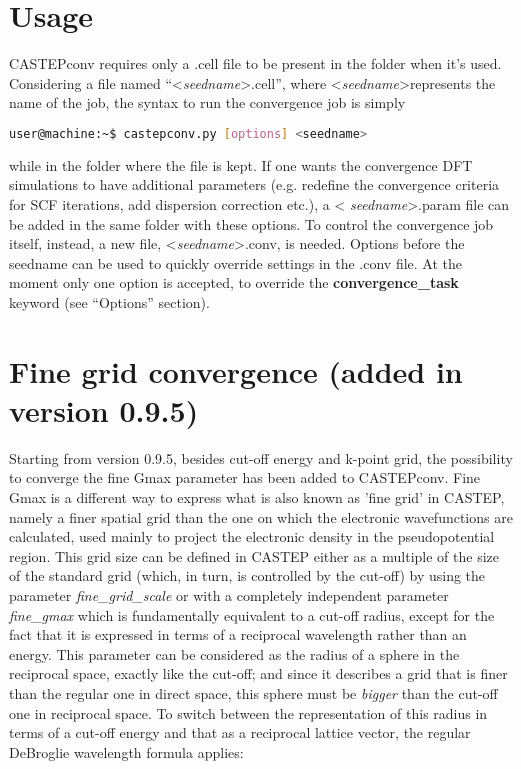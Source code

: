 \documentclass[10pt]{article}
\begin{document}
\section{Usage}

CASTEPconv requires only a .cell file to be present in the folder when it's 
used. Considering a file named ``\textless \textit{seedname}\textgreater.cell'', 
where \textless \textit{seedname}\textgreater represents the name of the job, 
the syntax to run the convergence job is simply

\begin{lstlisting}[language=Bash]
 user@machine:~$ castepconv.py [options] <seedname>
\end{lstlisting}

while in the folder where the file is kept. If one wants the convergence DFT 
simulations to have additional parameters (e.g. redefine the convergence 
criteria for SCF iterations, add dispersion correction etc.), a \textless 
\textit{seedname}\textgreater.param file can be added in the same folder with 
these options. To control the convergence job itself, instead, a new file, 
\textless \textit{seedname}\textgreater.conv, is needed.\newline
Options before the seedname can be used to quickly override settings in the .conv file.
At the moment only one option is accepted, to override the \textbf{convergence\_task} keyword (see ``Options'' section).

\section{Fine grid convergence (added in version 0.9.5)}

Starting from version 0.9.5, besides cut-off energy and k-point grid, the possibility to converge the fine Gmax parameter has been added to CASTEPconv.\newline
Fine Gmax is a different way to express what is also known as 'fine grid' in CASTEP, namely a finer spatial grid than the one on which the electronic wavefunctions are calculated, used mainly to project the electronic density in the pseudopotential region. This grid size can be defined in CASTEP either as a multiple of the size of the standard grid (which, in turn, is controlled by the cut-off) by using the parameter \textit{fine\_grid\_scale} or with a completely independent parameter \textit{fine\_gmax} which is fundamentally equivalent to a cut-off radius, except for the fact that it is expressed in terms of a reciprocal wavelength rather than an energy. This parameter can be considered as the radius of a sphere in the reciprocal space, exactly like the cut-off; and since it describes a grid that is finer than the regular one in direct space, this sphere must be \textit{bigger} than the cut-off one in reciprocal space.\newline
To switch between the representation of this radius in terms of a cut-off energy and that as a reciprocal lattice vector, the regular DeBroglie wavelength formula applies:
\end{document}
